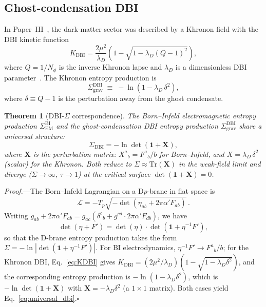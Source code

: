 \documentclass[prl,twocolumn,superscriptaddress,longbibliography]{revtex4-2}
\newtheorem{theorem}{Theorem}
\newcommand{\tauasym}{\tau}
\newcommand{\Sgrav}{\Sigma_{\mathrm{grav}}}
\newcommand{\Sem}{\Sigma_{\mathrm{EM}}}
\newcommand{\KDBI}{K_{\mathrm{DBI}}}
\begin{document}
\subsection{Ghost-condensation DBI}

In Paper~III~\cite{PaperIII}, the dark-matter sector was
described by a Khronon field with the DBI kinetic function
\begin{equation}
  \KDBI = \frac{2\mu^2}{\lambda_D}\!\left(
  1 - \sqrt{1 - \lambda_D (Q - 1)^2}\right),
  \label{eq:KDBI}
\end{equation}
where $Q = 1/N_\phi$ is the inverse Khronon lapse and
$\lambda_D$ is a dimensionless DBI parameter~\cite{BlanchetSkordis2024}.
The Khronon entropy production is
\begin{equation}
  \Sgrav^{\mathrm{DBI}} \;\equiv\;
  -\ln\!\left(1 - \lambda_D\,\delta^2\right),
  \label{eq:Sigma_DBI}
\end{equation}
where $\delta \equiv Q - 1$ is the perturbation away from
the ghost condensate.

\begin{theorem}[DBI-$\Sigma$ correspondence]
\label{thm:dbi}
The Born--Infeld electromagnetic entropy production
$\Sem^{\mathrm{BI}}$ and the ghost-condensation DBI entropy
production $\Sgrav^{\mathrm{DBI}}$ share a universal structure:
\begin{equation}
  \Sigma_{\mathrm{DBI}} = -\ln\det(\mathbf{1} + \mathbf{X}),
  \label{eq:universal_dbi}
\end{equation}
where $\mathbf{X}$ is the perturbation matrix: $X^a{}_b =
F^a{}_b/b$ for Born--Infeld, and
$X = \lambda_D\,\delta^2$ (scalar) for the Khronon.
Both reduce to $\Sigma \approx \mathrm{Tr}(\mathbf{X})$ in
the weak-field limit and diverge ($\Sigma \to \infty$,
$\tauasym \to 1$) at the critical surface
$\det(\mathbf{1} + \mathbf{X}) = 0$.
\end{theorem}

\textit{Proof.}---The Born--Infeld Lagrangian on a D$p$-brane
in flat space is~\cite{Polchinski1998}
\begin{equation}
  \mathcal{L} = -T_p\sqrt{-\det(\eta_{ab}
  + 2\pi\alpha' F_{ab})}\,.
  \label{eq:Dbrane}
\end{equation}
Writing $g_{ab} + 2\pi\alpha' F_{ab} = g_{ac}
(\delta^c{}_b + g^{cd}\cdot 2\pi\alpha' F_{db})$, we have
\begin{equation}
  \det(\eta + F') = \det(\eta)\cdot
  \det(\mathbf{1} + \eta^{-1}F'),
\end{equation}
so that the D-brane entropy production takes the form
$\Sigma = -\ln|\det(\mathbf{1} + \eta^{-1}F')|$.
For BI electrodynamics, $\eta^{-1}F' \to F^a{}_b/b$;
for the Khronon DBI,
Eq.~\eqref{eq:KDBI} gives
$\KDBI = (2\mu^2/\lambda_D)(1 - \sqrt{1 - \lambda_D\delta^2})$,
and the corresponding entropy production is
$-\ln(1 - \lambda_D\delta^2)$, which is
$-\ln\det(\mathbf{1} + \mathbf{X})$ with
$\mathbf{X} = -\lambda_D\delta^2$ (a $1\times 1$ matrix).
Both cases yield Eq.~\eqref{eq:universal_dbi}.\hfill$\square$
\end{document}
